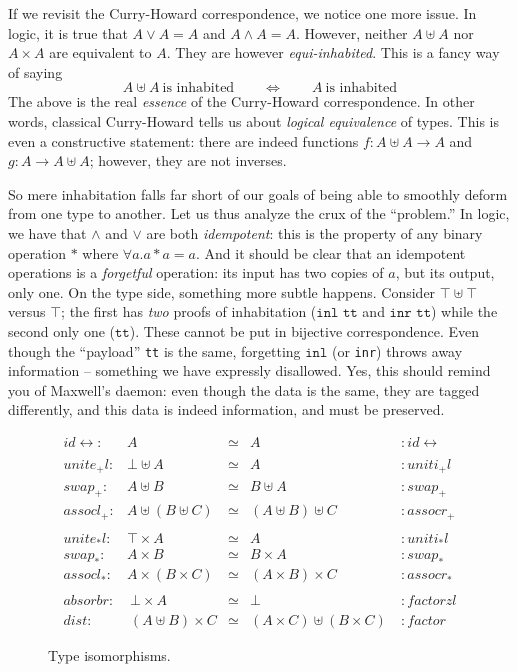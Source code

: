 \documentclass{article}
\newcommand{\identlp}{\mathit{unite}_+\mathit{l}}
\newcommand{\identrp}{\mathit{uniti}_+\mathit{l}}
\newcommand{\swapp}{\mathit{swap}_+}
\newcommand{\assoclp}{\mathit{assocl}_+}
\newcommand{\assocrp}{\mathit{assocr}_+}
\newcommand{\identlt}{\mathit{unite}_*\mathit{l}}
\newcommand{\identrt}{\mathit{uniti}_*\mathit{l}}
\newcommand{\swapt}{\mathit{swap}_*}
\newcommand{\assoclt}{\mathit{assocl}_*}
\newcommand{\assocrt}{\mathit{assocr}_*}
\newcommand{\factorzl}{\mathit{factorzl}}
\newcommand{\dist}{\mathit{dist}}
\newcommand{\factor}{\mathit{factor}}
\newcommand{\distz}{\mathit{absorbr}}
\newcommand{\idc}{\mathit{id}\!\!\leftrightarrow}
\begin{document}
If we revisit the Curry-Howard correspondence, we notice one
more issue. In logic, it is true that $A \lor A = A$ and
$A \land A = A$. However, neither $A \uplus A$ nor $A \times A$ are
equivalent to $A$. They are however \emph{equi-inhabited}. This is
a fancy way of saying
\[ A \uplus A \ \text{is inhabited} \qquad \Leftrightarrow \qquad A \
  \text{is inhabited} \] The above is the real \textit{essence} of the
Curry-Howard correspondence.  In other words, classical Curry-Howard
tells us about \emph{logical equivalence} of types. This is even a
constructive statement: there are indeed functions
$f : A \uplus A \rightarrow A$ and $g : A \rightarrow A \uplus A$;
however, they are not inverses.

So mere inhabitation falls far short of our goals of being able to
smoothly deform from one type to another. Let us thus analyze the crux
of the ``problem.'' In logic, we have that $\land$ and $\lor$ are both
\emph{idempotent}: this is the property of any binary operation $*$
where $\forall a. a * a = a$. And it should be clear that an
idempotent operations is a \emph{forgetful} operation: its input has
two copies of $a$, but its output, only one. On the type side,
something more subtle happens. Consider $\top \uplus \top$
versus $\top$; the first has \emph{two} proofs of inhabitation
($\texttt{inl tt}$ and $\texttt{inr tt}$) while the second only one
($\texttt{tt}$). These cannot be put in bijective correspondence. Even
though the ``payload'' \texttt{tt} is the same, forgetting
$\texttt{inl}$ (or \texttt{inr}) throws away information -- something
we have expressly disallowed.  Yes, this should remind you of
Maxwell's daemon: even though the data is the same, they are tagged
differently, and this data is indeed information, and must be
preserved.

\begin{figure}[t]
\[
\begin{array}{rrcll}
\idc :& A & \simeq & A &: \idc \\
\\
\identlp :&  \bot \uplus A & \simeq & A &: \identrp \\
\swapp :&  A \uplus B & \simeq & B \uplus A &: \swapp \\
\assoclp :&  A \uplus (B \uplus C) & \simeq & (A \uplus B) \uplus C &: \assocrp \\
\\
\identlt :&  \top \times A & \simeq & A &: \identrt \\
\swapt :&  A \times B & \simeq & B \times A &: \swapt \\
\assoclt :&  A \times (B \times C) & \simeq & (A \times B) \times C &: \assocrt \\
\\
\distz :&~ \bot \times A & \simeq & \bot ~ &: \factorzl \\
\dist :&~ (A \uplus B) \times C & \simeq & (A \times C) \uplus (B \times C)~ &: \factor
\end{array}
\]
\caption{Type isomorphisms.}
\label{type-isos}
\end{figure}
\end{document}
